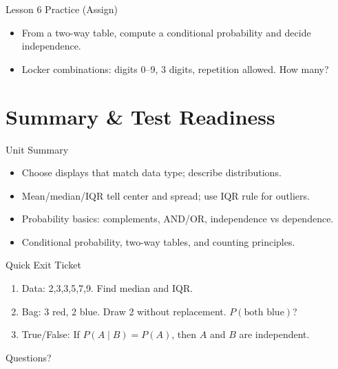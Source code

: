 \documentclass[aspectratio=169]{beamer}
\begin{document}
\begin{frame}{Lesson 6 Practice (Assign)}
\begin{itemize}
  \item From a two-way table, compute a conditional probability and decide independence.
  \item Locker combinations: digits 0--9, 3 digits, repetition allowed. How many?
\end{itemize}
\end{frame}

\section{Summary \& Test Readiness}

\begin{frame}{Unit Summary}
\begin{itemize}
  \item Choose displays that match data type; describe distributions.
  \item Mean/median/IQR tell center and spread; use IQR rule for outliers.
  \item Probability basics: complements, AND/OR, independence vs dependence.
  \item Conditional probability, two-way tables, and counting principles.
\end{itemize}
\end{frame}

\begin{frame}{Quick Exit Ticket}
\begin{enumerate}
  \item Data: 2,3,3,5,7,9. Find median and IQR.
  \item Bag: 3 red, 2 blue. Draw 2 without replacement. $P(\text{both blue})$?
  \item True/False: If $P(A\mid B)=P(A)$, then $A$ and $B$ are independent.
\end{enumerate}
\end{frame}

\begin{frame}
\centering \Large Questions?
\end{frame}
\end{document}
